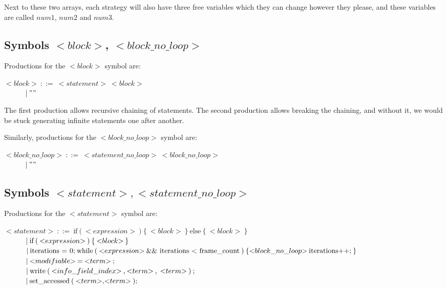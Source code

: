 Next to these two arrays, each strategy will also have three free variables which they can change however they please, and these variables are called $num1$, $num2$ and $num3$.

\subsection{Symbols ${<}block{>}$, ${<}block\_no\_loop{>}$}
Productions for the ${<}block{>}$ symbol are:

\noindent
$ {<}block{>}\:::=\:{<}statement{>}\:{<}block{>}$\\
$ \indent\indent |\:""$

The first production allows recursive chaining of statements. The second production allows breaking the chaining, and without it, we would be stuck generating infinite statements one after another.

Similarly, productions for the ${<}block\_no\_loop{>}$ symbol are:

\noindent
$ {<}block\_no\_loop{>}\:::=\:{<}statement\_no\_loop{>}\:{<}block\_no\_loop{>}$\\
$ \indent\indent |\:""$

\subsection{Symbols ${<}statement{>}, {<}statement\_no\_loop{>}$}
Productions for the ${<}statement{>}$ symbol are:

\noindent
$ {<}statement{>}\:::=\:\text{if}\:\text{(}\:{<}expression{>}\:\text{)}\:\text{\{}\:{<}block{>}\:\text{\}}\:\text{else}\:\text{\{}\:{<}block{>}\:\text{\}} $\\
$ \indent\indent |\:\text{if}\:\text{(}\:{<}expression{>}\:\text{)}\:\text{\{}\:{<}block{>}\:\text{\}}$\\
$ \indent\indent |\:\text{iterations = 0;}\:\text{while}\:\text{(}\:{<}expression{>}\:\text{\&\& iterations < frame\_count}\:\text{)}\:\text{\{}\:\\{<}block\_no\_loop{>}\:\text{iterations++;}\:\text{\}} $\\
$ \indent\indent |\:{<}modifiable{>}\:\text{=}\:{<}term{>}\:\text{;} $\\
$ \indent\indent |\:\text{write}\:\text{(}\:{<}info\_field\_index{>}\:\text{,}\:{<}term{>}\:\text{,}\:\:{<}term{>}\:\text{)}\:\text{;} $\\
$ \indent\indent |\:\text{set\_accessed}\:\text{(}\:{<}term{>}\text{,}{<}term{>}\:\text{)};$

